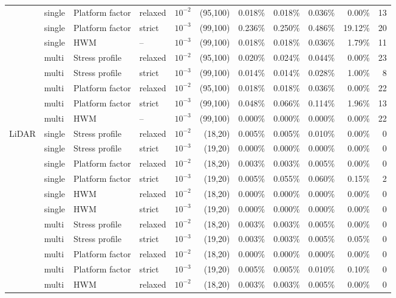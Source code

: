 \begin{table}[ht]
{\begin{tabular}{llllrrrrrrr}
 & single & Platform factor & relaxed & $10^{-2}$ & (95,100) & 0.018\% & 0.018\% & 0.036\% & 0.00\% & 13 \\
 & single & Platform factor & strict & $10^{-3}$ & (99,100) & 0.236\% & 0.250\% & 0.486\% & 19.12\% & 20 \\
 & single & HWM & -- & $10^{-3}$ & (99,100) & 0.018\% & 0.018\% & 0.036\% & 1.79\% & 11 \\
 & multi & Stress profile & relaxed & $10^{-2}$ & (95,100) & 0.020\% & 0.024\% & 0.044\% & 0.00\% & 23 \\
 & multi & Stress profile & strict & $10^{-3}$ & (99,100) & 0.014\% & 0.014\% & 0.028\% & 1.00\% & 8 \\
 & multi & Platform factor & relaxed & $10^{-2}$ & (95,100) & 0.018\% & 0.018\% & 0.036\% & 0.00\% & 22 \\
 & multi & Platform factor & strict & $10^{-3}$ & (99,100) & 0.048\% & 0.066\% & 0.114\% & 1.96\% & 13 \\
 & multi & HWM & -- & $10^{-3}$ & (99,100) & 0.000\% & 0.000\% & 0.000\% & 0.00\% & 22 \\
\midrule
LiDAR & single & Stress profile & relaxed & $10^{-2}$ & (18,20) & 0.005\% & 0.005\% & 0.010\% & 0.00\% & 0 \\
 & single & Stress profile & strict & $10^{-3}$ & (19,20) & 0.000\% & 0.000\% & 0.000\% & 0.00\% & 0 \\
 & single & Platform factor & relaxed & $10^{-2}$ & (18,20) & 0.003\% & 0.003\% & 0.005\% & 0.00\% & 0 \\
 & single & Platform factor & strict & $10^{-3}$ & (19,20) & 0.005\% & 0.055\% & 0.060\% & 0.15\% & 2 \\
 & single & HWM & relaxed & $10^{-2}$ & (18,20) & 0.000\% & 0.000\% & 0.000\% & 0.00\% & 0 \\
 & single & HWM & strict & $10^{-3}$ & (19,20) & 0.000\% & 0.000\% & 0.000\% & 0.00\% & 0 \\
 & multi & Stress profile & relaxed & $10^{-2}$ & (18,20) & 0.003\% & 0.003\% & 0.005\% & 0.00\% & 0 \\
 & multi & Stress profile & strict & $10^{-3}$ & (19,20) & 0.003\% & 0.003\% & 0.005\% & 0.05\% & 0 \\
 & multi & Platform factor & relaxed & $10^{-2}$ & (18,20) & 0.000\% & 0.000\% & 0.000\% & 0.00\% & 0 \\
 & multi & Platform factor & strict & $10^{-3}$ & (19,20) & 0.005\% & 0.005\% & 0.010\% & 0.10\% & 0 \\
 & multi & HWM & relaxed & $10^{-2}$ & (18,20) & 0.003\% & 0.003\% & 0.005\% & 0.00\% & 0 \\

\end{tabular}}
\end{table}
